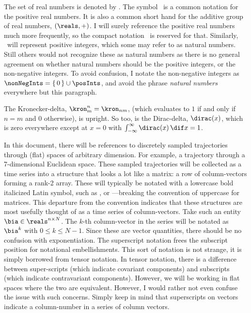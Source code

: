 The set of real numbers is denoted by \reals{}.
The symbol \posReals\ is a common notation for the positive real numbers. It is
also a common short hand for the additive group of real numbers, $(\reals, +)$.
I will surely reference the positive real numbers much more frequently, so the
compact notation \posReals\ is reserved for that. Similarly, \posInts{}\ will represent
positive integers, which some may refer to as natural numbers. Still others
would not recognize these as natural numbers as there is no general agreement on
whether natural numbers should be the positive integers, or the non-negative
integers. To avoid confusion, I notate the non-negative integers as
$\nonNegInts = \{\,0\,\} \cup \posInts$, and avoid the phrase \emph{natural
numbers} everywhere but this paragraph.

The Kronecker-delta, $\kron^n_m=\kron_{nm}$,
(which evaluates to $1$ if and only if $n=m$ and $0$ otherwise), is upright. So
too, is the Dirac-delta, $\dirac(x)$, which is
zero everywhere except at $x=0$ with $\int_{-\infty}^\infty \dirac(x)\,\dif x =
1$.

In this document, there will be references to discretely sampled trajectories
through (flat) spaces of arbitrary dimension. For example, a trajectory through
a 7-dimensional Euclidean space. These sampled trajectories will be collected as
a time series into a structure that looks a lot like a matrix: a row of
column-vectors forming a rank-2 array. These will typically be notated with a
lowercase bold italicized Latin symbol, such as \q, or \cu---breaking the
convention of uppercase for matrices. This departure from the convention
indicates that these structures are most usefully thought of as a time series of
column-vectors. Take such an entity $\bia \in \reals^{n\times N}$. The $k$-th
column-vector in the series will be notated as $\bia^k$ with $0 \le k \le N-1$.
Since these are vector quantities, there should be no confusion with
exponentiation. The superscript notation frees the subscript position for
notational embellishments. This sort of notation is not strange, it is simply
borrowed from tensor notation. In tensor notation, there is a difference between
super-scripts (which indicate covariant components) and subscripts (which
indicate contravariant components). However, we will be working in flat spaces
where the two are equivalent. However, I would rather not even confuse the issue
with such concerns. Simply keep in mind that superscripts on vectors indicate a
column-number in a series of column vectors.

